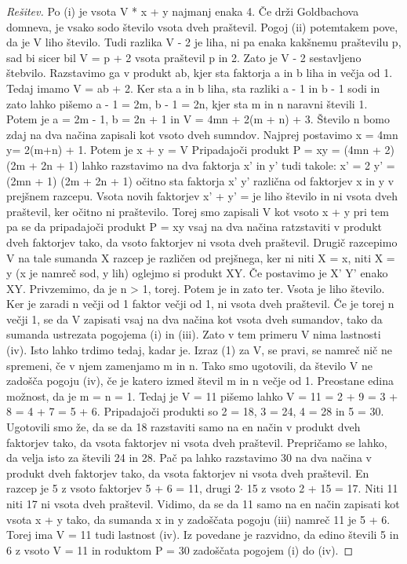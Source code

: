 \documentclass{amsart}
\begin{document}
\begin{proof}[Rešitev]
    Po (i) je  vsota V * x + y najmanj enaka 4. Če drži Goldbachova domneva, je vsako sodo število  vsota  dveh praštevil. 
    Pogoj (ii) potemtakem pove, da je V liho število. Tudi razlika V - 2 je liha, ni pa enaka kakšnemu praštevilu p, sad bi sicer 
    bil V = p + 2 vsota praštevil p in 2. Zato je V - 2 sestavljeno štebvilo. Razstavimo ga v produkt ab, kjer sta faktorja a in b
    liha in večja  od 1. Tedaj imamo V = ab + 2. Ker sta a in b liha, sta razliki a - 1 in b - 1 sodi in zato lahko pišemo a - 1 = 2m, b - 1 = 2n, kjer sta m in n
    naravni števili 1. Potem je a = 2m - 1, b = 2n + 1 in V = 4mn + 2(m + n) + 3.
    Število n bomo zdaj na dva načina zapisali kot vsoto dveh sumndov. Najprej postavimo x = 4mn y= 2(m+n) + 1. Potem je x + y = V
    Pripadajoči produkt P = xy = (4mn + 2) (2m + 2n + 1) lahko razstavimo na dva faktorja x' in y' tudi takole: x' = 2 y' = (2mn + 1)
     (2m + 2n + 1) očitno sta faktorja x' y' različna od faktorjev x in y v prejšnem razcepu. Vsota novih faktorjev x' + y' = je liho
      število in ni vsota dveh praštevil, ker očitno ni praštevilo. Torej smo zapisali V kot vsoto x + y pri tem pa se da pripadajoči
       produkt P = xy vsaj na dva načina ratzstaviti v produkt dveh faktorjev tako, da vsoto faktorjev ni vsota dveh praštevil. 
       Drugič razcepimo V na tale sumanda X razcep je različen od prejšnega, ker ni 
    niti X = x, niti X = y (x je namreč sod, y lih) oglejmo si produkt XY. Če postavimo je X' Y' enako XY. Privzemimo, da je n > 1,
     torej. Potem je in zato ter. Vsota je liho število. Ker je zaradi n večji od 1 faktor večji od 1, ni vsota dveh praštevil. 
    Če je torej n večji 1, se da V zapisati vsaj na dva načina kot vsota dveh sumandov, tako da sumanda ustrezata pogojema (i) in 
    (iii). Zato v tem primeru V nima lastnosti (iv). Isto lahko trdimo tedaj, kadar je. Izraz (1) za V, se pravi, se namreč nič 
    ne spremeni, če v njem zamenjamo m in n. Tako smo ugotovili, da število V ne zadošča pogoju (iv), če je katero izmed števil 
    m in n večje od 1.
    Preostane edina možnost, da je m = n = 1. Tedaj je V = 11 pišemo lahko V = 11 = 2 + 9 = 3 + 8 = 4 + 7 = 5 + 6. Pripadajoči 
    produkti so 2 = 18, 3  = 24, 4 = 28 in 5 = 30. Ugotovili smo že,
    da se da 18 razstaviti samo na en način v produkt dveh faktorjev tako, da vsota faktorjev ni vsota dveh praštevil. Prepričamo
     se lahko, da velja isto za števili 24 in 28. Pač pa lahko razstavimo 30 na dva načina v produkt dveh faktorjev tako, da vsota
      faktorjev ni vsota dveh praštevil. En razcep je 5 z vsoto faktorjev 5 + 6 = 11, drugi 2$\cdot$ 15 z vsoto 2 + 15 = 17.
       Niti 11 niti 17 ni vsota dveh praštevil. Vidimo, da se da 11 samo na en način zapisati kot vsota x + y tako, da sumanda x 
       in y zadoščata pogoju (iii) namreč 11 je 5 + 6. Torej ima V = 11 tudi lastnost (iv). 
    Iz povedane je razvidno, da edino števili 5 in 6 z vsoto V = 11 in roduktom P = 30 zadoščata pogojem (i) do (iv).


\end{proof}
\end{document}
